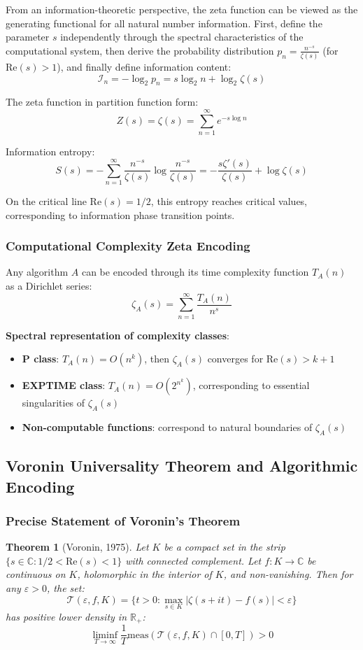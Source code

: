 \documentclass[12pt]{article}
\theoremstyle{plain}
\newtheorem{theorem}{Theorem}[section]
\theoremstyle{definition}
\newcommand{\R}{\mathbb{R}}
\newcommand{\C}{\mathbb{C}}
\newcommand{\cT}{\mathcal{T}}
\newcommand{\Re}{\text{Re}}
\begin{document}
From an information-theoretic perspective, the zeta function can be viewed as the generating functional for all natural number information. First, define the parameter $s$ independently through the spectral characteristics of the computational system, then derive the probability distribution $p_n = \frac{n^{-s}}{\zeta(s)}$ (for $\Re(s) > 1$), and finally define information content:
$$\mathcal{I}_n = -\log_2 p_n = s \log_2 n + \log_2 \zeta(s)$$

The zeta function in partition function form:
$$Z(s) = \zeta(s) = \sum_{n=1}^{\infty} e^{-s \log n}$$

Information entropy:
$$S(s) = -\sum_{n=1}^{\infty} \frac{n^{-s}}{\zeta(s)} \log \frac{n^{-s}}{\zeta(s)} = -\frac{s\zeta'(s)}{\zeta(s)} + \log \zeta(s)$$

On the critical line $\Re(s) = 1/2$, this entropy reaches critical values, corresponding to information phase transition points.

\subsubsection{Computational Complexity Zeta Encoding}

Any algorithm $A$ can be encoded through its time complexity function $T_A(n)$ as a Dirichlet series:
$$\zeta_A(s) = \sum_{n=1}^{\infty} \frac{T_A(n)}{n^s}$$

\textbf{Spectral representation of complexity classes}:
\begin{itemize}
\item \textbf{P class}: $T_A(n) = O(n^k)$, then $\zeta_A(s)$ converges for $\Re(s) > k+1$
\item \textbf{EXPTIME class}: $T_A(n) = O(2^{n^k})$, corresponding to essential singularities of $\zeta_A(s)$
\item \textbf{Non-computable functions}: correspond to natural boundaries of $\zeta_A(s)$
\end{itemize}

\subsection{Voronin Universality Theorem and Algorithmic Encoding}

\subsubsection{Precise Statement of Voronin's Theorem}

\begin{theorem}[Voronin, 1975]
Let $K$ be a compact set in the strip $\{s \in \C: 1/2 < \Re(s) < 1\}$ with connected complement. Let $f: K \to \C$ be continuous on $K$, holomorphic in the interior of $K$, and non-vanishing. Then for any $\varepsilon > 0$, the set:
$$\cT(\varepsilon, f, K) = \{t > 0: \max_{s \in K} |\zeta(s + it) - f(s)| < \varepsilon\}$$
has positive lower density in $\R_+$:
$$\liminf_{T \to \infty} \frac{1}{T} \text{meas}(\cT(\varepsilon, f, K) \cap [0, T]) > 0$$
\end{theorem}
\end{document}

